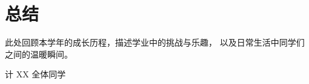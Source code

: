 \section{总结}

此处回顾本学年的成长历程，描述学业中的挑战与乐趣，
以及日常生活中同学们之间的温暖瞬间。

\begin{flushright}
    计 XX 全体同学
\end{flushright}
